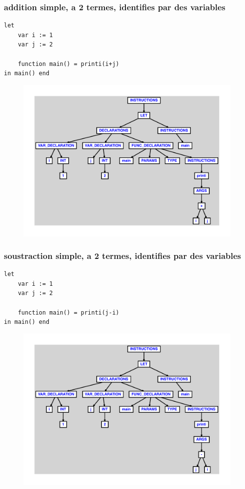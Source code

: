 \documentclass{article}
\begin{document}
\subsubsection{addition simple, a 2 termes, identifies par des variables}
\begin{lstlisting}
let
	var i := 1
	var j := 2

	function main() = printi(i+j)
in main() end
\end{lstlisting}
\newpage
\begin{figure}[H]
\centering
\includegraphics[max width=\textwidth]{ast/ast_51.pdf}
\end{figure}
\newpage
\subsubsection{soustraction simple, a 2 termes, identifies par des variables}
\begin{lstlisting}
let
	var i := 1
	var j := 2

	function main() = printi(j-i)
in main() end
\end{lstlisting}
\newpage
\begin{figure}[H]
\centering
\includegraphics[max width=\textwidth]{ast/ast_52.pdf}
\end{figure}
\newpage
\end{document}
